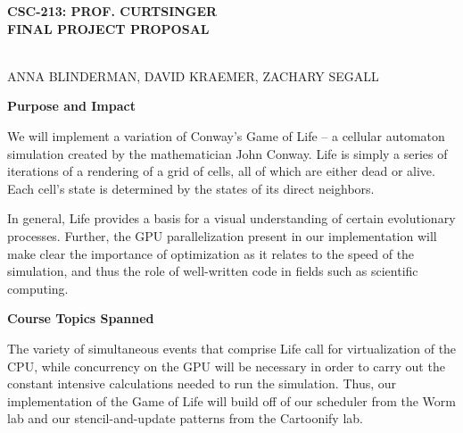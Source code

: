 \documentclass[12pt]{article}
\begin{document}
\setlength{\parindent}{3em}
\setlength{\parskip}{1em}


\newcommand{\ttspc}{\hspace{1mm}}
\newcommand{\tspc}{\hspace{2mm}}
\newcommand{\lspc}{\hspace{10mm}}
\newcommand{\ttc}{, \ttspc}
\newcommand{\nth}{^{\text{th}}}
\newcommand{\mybegit}{\vspace{-2mm} \begin{itemize} \itemsep-1em }
\newcommand{\mytitle}[1]{\vspace{10mm} \noindent \textbf{{#1}}} 




\begin{center}
\begin{Large} \textbf{CSC-213: PROF. CURTSINGER} \\
\vspace{3mm} \textbf{FINAL PROJECT PROPOSAL} \end{Large} \\
\vspace{5mm} ANNA BLINDERMAN, DAVID KRAEMER, ZACHARY SEGALL
\end{center} 






\mytitle{Purpose and Impact}

	We will implement a variation of Conway's Game of Life -- a cellular automaton simulation created by the mathematician John Conway. Life is simply a series of iterations of a rendering of a grid of cells, all of which are either dead or alive. Each cell's state is determined by the states of its direct neighbors. 

	In general, Life provides a basis for a visual understanding of certain evolutionary processes. Further, the GPU parallelization present in our implementation will make clear the importance of optimization as it relates to the speed of the simulation, and thus the role of well-written code in fields such as scientific computing. 







\mytitle{Course Topics Spanned}

	The variety of simultaneous events that comprise Life call for virtualization of the CPU, while concurrency on the GPU will be necessary in order to carry out the constant intensive calculations needed to run the simulation. Thus, our implementation of the Game of Life will build off of our scheduler from the Worm lab and our stencil-and-update patterns from the Cartoonify lab.
\end{document}
